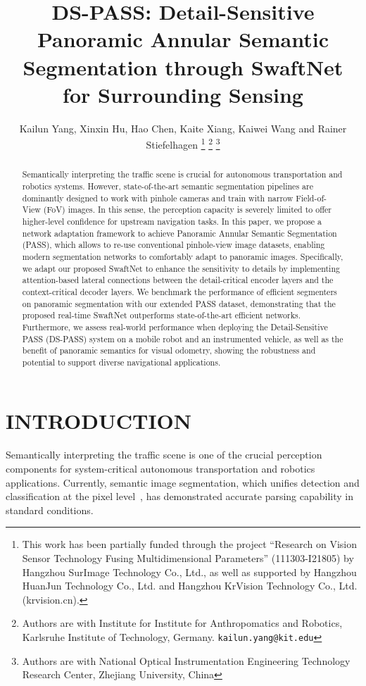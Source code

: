 \documentclass[letterpaper, 10 pt, conference]{ieeeconf}
\title{\LARGE \bf
DS-PASS: Detail-Sensitive Panoramic Annular Semantic Segmentation through SwaftNet for Surrounding Sensing
}
\author{Kailun Yang, Xinxin Hu, Hao Chen, Kaite Xiang, Kaiwei Wang and Rainer Stiefelhagen
\thanks{This work has been partially funded through the project ``Research on Vision Sensor Technology Fusing Multidimensional Parameters'' (111303-I21805) by Hangzhou SurImage Technology Co., Ltd., as well as supported by Hangzhou HuanJun Technology Co., Ltd. and Hangzhou KrVision Technology Co., Ltd. (krvision.cn).}
\thanks{Authors are with Institute for Institute for Anthropomatics and Robotics, Karlsruhe Institute of Technology, Germany. \tt kailun.yang@kit.edu}
\thanks{Authors are with National Optical Instrumentation Engineering Technology Research Center, Zhejiang University, China}
}
\begin{document}
\maketitle
\thispagestyle{empty}
\pagestyle{empty}

\begin{abstract}

Semantically interpreting the traffic scene is crucial for autonomous transportation and robotics systems. However, state-of-the-art semantic segmentation pipelines are dominantly designed to work with pinhole cameras and train with narrow Field-of-View (FoV) images. In this sense, the perception capacity is severely limited to offer higher-level confidence for upstream navigation tasks. In this paper, we propose a network adaptation framework to achieve Panoramic Annular Semantic Segmentation (PASS), which allows to re-use conventional pinhole-view image datasets, enabling modern segmentation networks to comfortably adapt to panoramic images. Specifically, we adapt our proposed SwaftNet to enhance the sensitivity to details by implementing attention-based lateral connections between the detail-critical encoder layers and the context-critical decoder layers. We benchmark the performance of efficient segmenters on panoramic segmentation with our extended PASS dataset, demonstrating that the proposed real-time SwaftNet outperforms state-of-the-art efficient networks. Furthermore, we assess real-world performance when deploying the Detail-Sensitive PASS (DS-PASS) system on a mobile robot and an instrumented vehicle, as well as the benefit of panoramic semantics for visual odometry, showing the robustness and potential to support diverse navigational applications.

\end{abstract}

\section{INTRODUCTION}

Semantically interpreting the traffic scene is one of the crucial perception components for system-critical autonomous transportation and robotics applications. Currently, semantic image segmentation, which unifies detection and classification at the pixel level~\cite{yang2018unifying}, has demonstrated accurate parsing capability in standard conditions.
\end{document}
